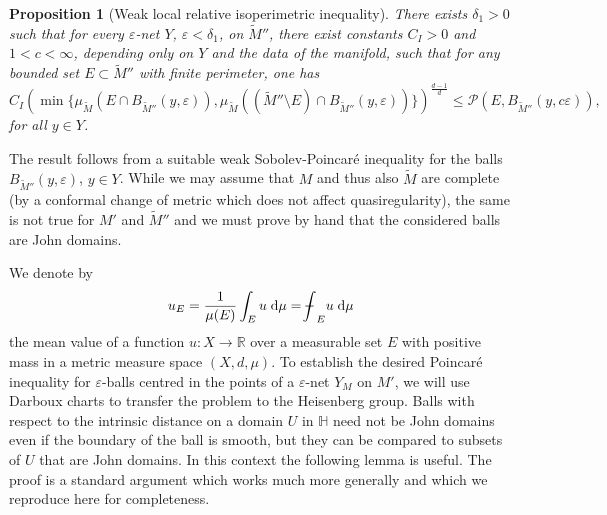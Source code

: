 \documentclass[10pt,letterpaper]{amsart}
\newtheorem{prop}[thm]{Proposition}
\theoremstyle{definition}
\numberwithin{thm}{subsection}
\numberwithin{equation}{section}
\begin{document}
\begin{prop}[Weak local relative isoperimetric inequality]\label{p:localIP}
There exists $\delta_1>0$ such that for every $\varepsilon$-net $Y$, $\varepsilon< \delta_1$, on $\widetilde{M}''$, there exist constants $C_I>0$ and $1<c<\infty$, depending only on $Y$ and the data of the manifold, such that for any bounded set $E\subset \widetilde{M}''$ with finite perimeter, one has
\begin{displaymath}
C_I \left(\min \{\mu_{\widetilde{M}}(E\cap B_{\widetilde{M}''}(y,\varepsilon)),\mu_{\widetilde{M}}((\widetilde{M}'' \setminus E) \cap B_{\widetilde{M}''}(y,\varepsilon))\}\right)^{\frac{d-1}{d}}\leq \mathcal{P}(E,B_{\widetilde{M}''}(y,c\varepsilon)),
\end{displaymath}
for all $y \in Y$.
\end{prop}

The result follows from a suitable weak Sobolev-Poincar\'{e} inequality for the balls $B_{\widetilde{M}''}(y,\varepsilon)$, $y\in Y$. While we may assume that $M$ and thus also $\widetilde{M}$ are complete (by a conformal change of metric which does not affect quasiregularity), the same is not true for $M'$ and $\widetilde{M}''$
and we must prove by hand that the considered balls are John domains.

We denote by
\begin{displaymath}
u_E = \frac{1}{\mu(E)} \int_E u \;\mathrm{d}\mu= {\mathchoice
          {\mathop{\vrule width 6pt height 3 pt depth -2.5pt
                  \kern -8pt \intop}\nolimits_{E}}          {\mathop{\vrule width 5pt height 3 pt depth -2.6pt
                  \kern -6pt \intop}\nolimits_{E}}          {\mathop{\vrule width 5pt height 3 pt depth -2.6pt
                  \kern -6pt \intop}\nolimits_{E}}          {\mathop{\vrule width 5pt height 3 pt depth -2.6pt
                  \kern -6pt \intop}\nolimits_{E}}} u \;\mathrm{d}\mu
\end{displaymath}
the mean value of a function $u:X \to \mathbb{R}$ over a measurable set $E$ with positive mass in a metric measure space $(X,d,\mu)$.
To establish the desired Poincar\'{e} inequality for $\varepsilon$-balls centred in the points of a $\varepsilon$-net $Y_M$ on $M'$, we will use Darboux charts to transfer the problem to the Heisenberg group. Balls with respect to the intrinsic distance on a domain $U$ in ${\mathbb H}$ need not be John domains even if the boundary of the ball is smooth, but they can be compared to subsets of $U$ that are John domains. In this context the following lemma is useful. The proof is a standard argument which works much more generally and which we reproduce here for completeness.
\end{document}
